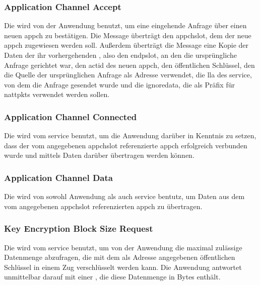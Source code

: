 \asprotoappchinreqbytefield


\subsubsection{Application Channel Accept}
\label{dcl-asproto-appchaccept}
Die \msg{\asprotoappchaccept} wird von der Anwendung benutzt, um eine eingehende
Anfrage über einen neuen \gls{appch} zu bestätigen.
Die Message überträgt den \gls{appchslot}, dem der neue \gls{appch} zugewiesen
werden soll. Außerdem überträgt die Message eine Kopie der Daten der ihr
vorhergehenden \msg{\asprotoappchinreq}, also den \gls{endpslot}, an den die
ursprüngliche Anfrage gerichtet war, den \gls{actid} des neuen \gls{appch},
den öffentlichen Schlüssel, den die Quelle der ursprünglichen Anfrage als
Adresse verwendet, die \gls{lla} des \gls{service}, von dem die Anfrage gesendet
wurde und die \gls{ignoredata}, die als Präfix für \glspl{nattpkt} verwendet
werden sollen.

\asprotoappchacceptbytefield


\subsubsection{Application Channel Connected}
\label{dcl-asproto-appchconnected}
Die \msg{\asprotoappchconnected} wird vom \gls{service} benutzt, um die
Anwendung darüber in Kenntnis zu setzen, dass der vom angegebenen
\gls{appchslot} referenzierte \gls{appch} erfolgreich verbunden wurde und
mittels \msg{\asprotoappchdata} Daten darüber übertragen werden können.

\asprotoappchconnectedbytefield


\subsubsection{Application Channel Data}
\label{dcl-asproto-appchdata}
Die \msg{\asprotoappchdata} wird von sowohl Anwendung als auch \gls{service}
bentutz, um Daten aus dem vom angegebenen \gls{appchslot} referenzierten
\gls{appch} zu übertragen.

\asprotoappchdatabytefield


\subsubsection{Key Encryption Block Size Request}
\label{dcl-asproto-keyencblocksizereq}
Die \msg{\asprotokeyencblocksizereq} wird vom \gls{service} benutzt, um von der
Anwendung die maximal zulässige Datenmenge abzufragen, die mit dem als Adresse
angegebenen öffentlichen Schlüssel in einem Zug verschlüsselt werden kann.
Die Anwendung antwortet unmittelbar darauf mit einer \msg{\asprotokeynum}, die
diese Datenmenge in Bytes enthält.

